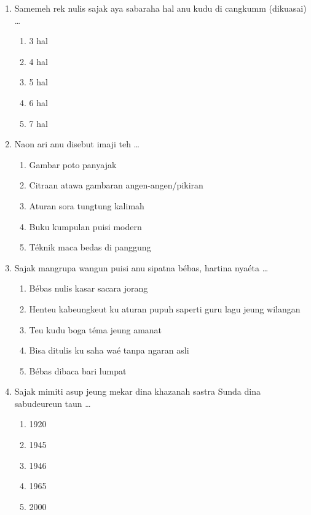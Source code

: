 \documentclass[12pt,a4paper]{article}
\begin{document}
\begin{enumerate}[leftmargin=*]
\item Samemeh rek nulis sajak aya sabaraha hal anu kudu di cangkumm (dikuasai) \dots
    \begin{enumerate}[label=\alph*.]
        \item 3 hal
        \item 4 hal
        \item 5 hal
        \item 6 hal
        \item 7 hal
    \end{enumerate}

\item Naon ari anu disebut imaji teh \dots
    \begin{enumerate}[label=\alph*.]
        \item Gambar poto panyajak
        \item Citraan atawa gambaran angen-angen/pikiran
        \item Aturan sora tungtung kalimah
        \item Buku kumpulan puisi modern
        \item Téknik maca bedas di panggung
    \end{enumerate}

\item Sajak mangrupa wangun puisi anu sipatna bébas, hartina nyaéta \dots
    \begin{enumerate}[label=\alph*.]
        \item Bébas nulis kasar sacara jorang
        \item Henteu kabeungkeut ku aturan pupuh saperti guru lagu jeung wilangan
        \item Teu kudu boga téma jeung amanat
        \item Bisa ditulis ku saha waé tanpa ngaran asli
        \item Bébas dibaca bari lumpat
    \end{enumerate}

\item Sajak mimiti asup jeung mekar dina khazanah sastra Sunda dina sabudeureun taun \dots
    \begin{enumerate}[label=\alph*.]
        \item 1920
        \item 1945
        \item 1946
        \item 1965
        \item 2000
    \end{enumerate}


\end{enumerate}
\end{document}

